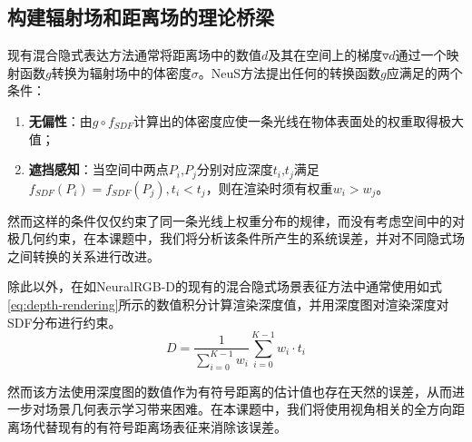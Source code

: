 \subsection{构建辐射场和距离场的理论桥梁}
\label{subsec:radiance2distance}
现有混合隐式表达方法通常将距离场中的数值$d$及其在空间上的梯度$\triangledown d$通过一个映射函数$g$转换为辐射场中的体密度$\sigma$。NeuS方法提出任何的转换函数$g$应满足的两个条件：
\begin{enumerate}
    \item \textbf{无偏性}：由$g\circ f_{SDF}$计算出的体密度应使一条光线在物体表面处的权重取得极大值；
    \item \textbf{遮挡感知}：当空间中两点$P_i$,$P_j$分别对应深度$t_i$,$t_j$满足$f_{SDF} (P_i )=f_{SDF} (P_j ),t_i<t_j$，则在渲染时须有权重$w_i>w_j$。
\end{enumerate}

然而这样的条件仅仅约束了同一条光线上权重分布的规律，而没有考虑空间中的对极几何约束，在本课题中，我们将分析该条件所产生的系统误差，并对不同隐式场之间转换的关系进行改进。

除此以外，在如NeuralRGB-D的现有的混合隐式场景表征方法中通常使用如式\ref{eq:depth-rendering}所示的数值积分计算渲染深度值，并用深度图对渲染深度对SDF分布进行约束。
\begin{equation}
    D = \frac 1 {\sum_{i=0}^{K-1}w_i}\sum_{i=0}^{K-1}w_i\cdot t_i
    \label{eq:depth-rendering}
\end{equation}

然而该方法使用深度图的数值作为有符号距离的估计值也存在天然的误差，从而进一步对场景几何表示学习带来困难。在本课题中，我们将使用视角相关的全方向距离场代替现有的有符号距离场表征来消除该误差。


